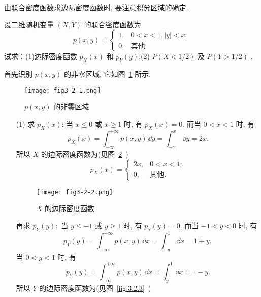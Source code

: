   由联合密度函数求边际密度函数时, 要注意积分区域的确定.
  \begin{example}\label{exam:3.2.3}
  	设二维随机变量 $(X,Y)$ 的联合密度函数为
  	\begin{equation*}
  	p(x,y)=
  	\begin{cases}
  	1, & 0<x<1,|y|<x;\\
  	0, & \text{其他}.
  	\end{cases}
  	\end{equation*}
  	试求：(1)边际密度函数 $p_{X}(x)$ 和 $p_{Y}(y)$;(2) $P(X<1/2)$ 及 $P(Y>1/2)$ .
  \end{example}
  \begin{solution}
  	首先识别 $p(x,y)$ 的非零区域, 它如图~\ref{fig:3.2.1} 所示.
  	\begin{figure}[htbp]
  		\centering
  		\texttt{[image: fig3-2-1.png]}
  		\caption{$p(x,y)$ 的非零区域}\label{fig:3.2.1}
  	\end{figure}
  	\begin{itemize}
  		\item[(1)]求 $p_X(x)$: 当 $x\leqslant0$ 或 $x\geqslant1$ 时, 有 $p_X(x)=0$. 而当 $0<x<1$ 时, 有
  		\begin{equation*}
  		p_X(x)=\int_{-\infty}^{+\infty}p(x,y)\,\dd y=\int_{-x}^{x}\,\dd y=2x.
  		\end{equation*}
  		所以 $X$ 的边际密度函数为(见图~\ref{fig:3.2.2}~)
  		\begin{equation*}
  		p_X(x)=
  		\begin{cases}
  		2x, & 0<x<1;\\
  		0, & \text{其他}.
  		\end{cases}
  		\end{equation*}
  		\begin{figure}[h]
  			\centering
  			\texttt{[image: fig3-2-2.png]}
  			\caption{$X$ 的边际密度函数}\label{fig:3.2.2}
  		\end{figure}
  		再求 $p_Y(y):$ 当 $y\leqslant-1$ 或 $y\geqslant1$ 时, 有 $p_Y(y)=0$. 而当 $-1<y<0$ 时, 有
  		\begin{equation*}
  		p_Y(y)=\int_{-\infty}^{+\infty}p(x,y)\,\dd x=\int_{-y}^{1}\,\dd x=1+y,
  		\end{equation*}
  		当 $0<y<1$ 时, 有
  		\begin{equation*}
  		p_Y(y)=\int_{-\infty}^{+\infty}p(x,y)\,\dd x=\int_{y}^{1}\,\dd x=1-y.
  		\end{equation*}
  		所以 $Y$ 的边际密度函数为(见图~\ref{fig:3.2.3}~)
  		\begin{equation*}

\end{equation*}
\end{itemize}
\end{solution}
